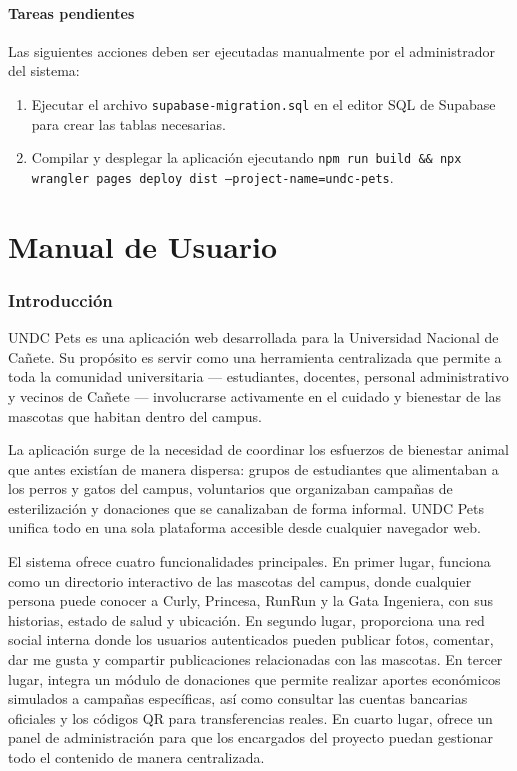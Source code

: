 \documentclass[12pt,a4paper]{article}
\begin{document}
\subsection{Tareas pendientes}

Las siguientes acciones deben ser ejecutadas manualmente por el administrador del sistema:

\begin{enumerate}
    \item Ejecutar el archivo \texttt{supabase-migration.sql} en el editor SQL de Supabase para crear las tablas necesarias.
    \item Compilar y desplegar la aplicación ejecutando \texttt{npm run build \&\& npx wrangler pages deploy dist --project-name=undc-pets}.
\end{enumerate}

\newpage
\part{Manual de Usuario}

\section{Introducción}

UNDC Pets es una aplicación web desarrollada para la Universidad Nacional de Cañete. Su propósito es servir como una herramienta centralizada que permite a toda la comunidad universitaria --- estudiantes, docentes, personal administrativo y vecinos de Cañete --- involucrarse activamente en el cuidado y bienestar de las mascotas que habitan dentro del campus.

La aplicación surge de la necesidad de coordinar los esfuerzos de bienestar animal que antes existían de manera dispersa: grupos de estudiantes que alimentaban a los perros y gatos del campus, voluntarios que organizaban campañas de esterilización y donaciones que se canalizaban de forma informal. UNDC Pets unifica todo en una sola plataforma accesible desde cualquier navegador web.

El sistema ofrece cuatro funcionalidades principales. En primer lugar, funciona como un directorio interactivo de las mascotas del campus, donde cualquier persona puede conocer a Curly, Princesa, RunRun y la Gata Ingeniera, con sus historias, estado de salud y ubicación. En segundo lugar, proporciona una red social interna donde los usuarios autenticados pueden publicar fotos, comentar, dar me gusta y compartir publicaciones relacionadas con las mascotas. En tercer lugar, integra un módulo de donaciones que permite realizar aportes económicos simulados a campañas específicas, así como consultar las cuentas bancarias oficiales y los códigos QR para transferencias reales. En cuarto lugar, ofrece un panel de administración para que los encargados del proyecto puedan gestionar todo el contenido de manera centralizada.
\end{document}
